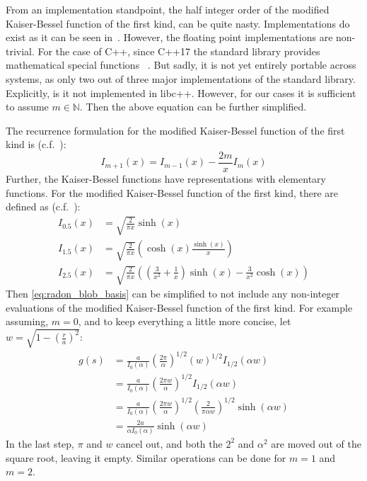 From an implementation standpoint, the half integer order of the modified Kaiser-Bessel function of
the first kind, can be quite nasty. Implementations do exist as it can be seen
in~\cite{temme_numerical_1975}. However, the floating point implementations are non-trivial. For the
case of C++, since C++17 the standard library provides mathematical special functions
~\cite{noauthor_c_nodate, noauthor_stdcyl_bessel_i_nodate}. But sadly, it is not yet entirely
portable across systems, as only two out of three major implementations of the standard library.
Explicitly, is it not implemented in libc++. However, for our cases it is sufficient to assume \(m
\in \mathbb{N}\). Then the above equation can be further simplified.

The recurrence formulation for the modified Kaiser-Bessel function of the first kind is
(c.f.~\cite[Chapter~9]{abramowitz_handbook_1972}):
\begin{equation}\label{eq:kaiser_bessel_recurrence}
	I_{m+1}(x) = I_{m-1}(x) - \frac{2 m}{x}I_m(x)
\end{equation}
Further, the Kaiser-Bessel functions have representations with elementary functions. For the
modified Kaiser-Bessel function of the first kind, there are defined as (c.f.~\cite[Chapter~10]{abramowitz_handbook_1972}):
\begin{align}\label{eq:kaiser_bessel_half_integer}
	I_{0.5}(x) & = \sqrt{\frac{2}{\pi x}} \sinh(x)                                                                               \\
	I_{1.5}(x) & = \sqrt{\frac{2}{\pi x}} \left( \cosh(x) \frac{\sinh(x)}{x} \right)                                             \\
	I_{2.5}(x) & = \sqrt{\frac{2}{\pi x}} \left(\left(\frac{3}{x^2} + \frac{1}{x}\right)\sinh(x) - \frac{3}{x^2} \cosh(x)\right)
\end{align}
Then \autoref{eq:radon_blob_basis} can be simplified to not include any non-integer evaluations of
the modified Kaiser-Bessel function of the first kind. For example assuming, \(m = 0\), and to keep
everything a little more concise, let \(w = \sqrt{1 - \left(\frac{r}{a}\right)^2}\):
\begin{align}\label{eq:radon_blob_basis_order_0_simplified}
	g(s) & = \frac{a}{I_0(\alpha)} \left(\frac{2\pi}{\alpha}\right)^{1/2} \left( w \right)^{1/2} I_{1/2}\left( \alpha w \right)                     \\
	     & = \frac{a}{I_0(\alpha)} \left(\frac{2\pi w}{\alpha}\right)^{1/2} I_{1/2}\left( \alpha w \right)                                          \\
	     & = \frac{a}{I_0(\alpha)} \left(\frac{2\pi w}{\alpha}\right)^{1/2} \left( \frac{2}{\pi \alpha w}\right)^{1/2} \sinh \left(\alpha w \right) \\
	     & = \frac{2 a}{\alpha I_0(\alpha)} \sinh \left(\alpha w \right)
\end{align}
In the last step, \(\pi\) and \(w\) cancel out, and both the \(2^2\) and \(\alpha^2\) are moved out
of the square root, leaving it empty. Similar operations can be done for \(m = 1\) and \(m = 2\).

